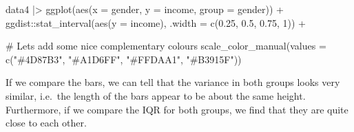 \documentclass[
  letterpaper,
]{krantz}
\makeatletter
\newenvironment{Shaded}{\begin{snugshade}}{\end{snugshade}}
\newcommand{\AttributeTok}[1]{\textcolor[rgb]{0.40,0.45,0.13}{#1}}
\newcommand{\CommentTok}[1]{\textcolor[rgb]{0.37,0.37,0.37}{#1}}
\newcommand{\DecValTok}[1]{\textcolor[rgb]{0.68,0.00,0.00}{#1}}
\newcommand{\FloatTok}[1]{\textcolor[rgb]{0.68,0.00,0.00}{#1}}
\newcommand{\FunctionTok}[1]{\textcolor[rgb]{0.28,0.35,0.67}{#1}}
\newcommand{\NormalTok}[1]{\textcolor[rgb]{0.00,0.23,0.31}{#1}}
\newcommand{\SpecialCharTok}[1]{\textcolor[rgb]{0.37,0.37,0.37}{#1}}
\newcommand{\StringTok}[1]{\textcolor[rgb]{0.13,0.47,0.30}{#1}}
\newenvironment{kframe}{%
\medskip{}
\setlength{\fboxsep}{.8em}
 \def\at@end@of@kframe{}%
 \ifinner\ifhmode%
  \def\at@end@of@kframe{\end{minipage}}%
  \begin{minipage}{\columnwidth}%
 \fi\fi%
 \def\FrameCommand##1{\hskip\@totalleftmargin \hskip-\fboxsep
 \colorbox{shadecolor}{##1}\hskip-\fboxsep
     \hskip-\linewidth \hskip-\@totalleftmargin \hskip\columnwidth}%
 \MakeFramed {\advance\hsize-\width
   \@totalleftmargin\z@ \linewidth\hsize
   \@setminipage}}%
 {\par\unskip\endMakeFramed%
 \at@end@of@kframe}
\renewenvironment{Shaded}{\begin{kframe}}{\end{kframe}}
\makeatother
\begin{document}
\begin{Shaded}
\begin{Highlighting}[]
\NormalTok{data4 }\SpecialCharTok{|\textgreater{}}
  \FunctionTok{ggplot}\NormalTok{(}\FunctionTok{aes}\NormalTok{(}\AttributeTok{x =}\NormalTok{ gender, }\AttributeTok{y =}\NormalTok{ income, }\AttributeTok{group =}\NormalTok{ gender)) }\SpecialCharTok{+}
\NormalTok{  ggdist}\SpecialCharTok{::}\FunctionTok{stat\_interval}\NormalTok{(}\FunctionTok{aes}\NormalTok{(}\AttributeTok{y =}\NormalTok{ income),}
                        \AttributeTok{.width =} \FunctionTok{c}\NormalTok{(}\FloatTok{0.25}\NormalTok{, }\FloatTok{0.5}\NormalTok{, }\FloatTok{0.75}\NormalTok{, }\DecValTok{1}\NormalTok{)) }\SpecialCharTok{+}

  \CommentTok{\# Let\textquotesingle{}s add some nice complementary colours}
  \FunctionTok{scale\_color\_manual}\NormalTok{(}\AttributeTok{values =} \FunctionTok{c}\NormalTok{(}\StringTok{"\#4D87B3"}\NormalTok{, }\StringTok{"\#A1D6FF"}\NormalTok{, }\StringTok{"\#FFDAA1"}\NormalTok{, }\StringTok{"\#B3915F"}\NormalTok{))}
\end{Highlighting}
\end{Shaded}

\begin{figure}[H]


\caption{\label{fig-homogeneity-variance-alt-vis}}

\end{figure}%

If we compare the bars, we can tell that the variance in both groups
looks very similar, i.e.~the length of the bars appear to be about the
same height. Furthermore, if we compare the IQR for both groups, we find
that they are quite close to each other.
\end{document}
